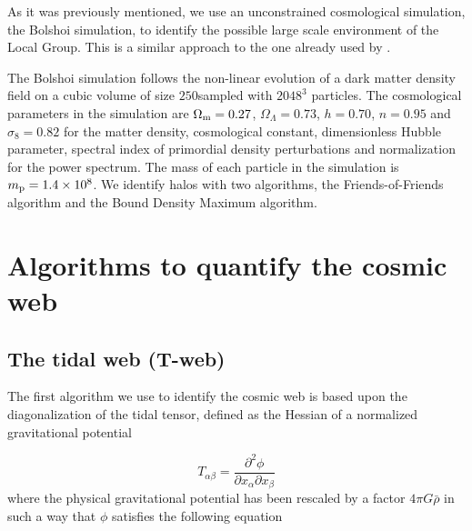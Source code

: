\documentclass[a4,useAMS,usenatbib,usegraphicx]{latex/mn2e}
\begin{document}
As it was previously mentioned, we use an unconstrained cosmological 
simulation, the Bolshoi simulation, to identify the possible large scale 
environment of the Local Group. This is a similar approach to the one already 
used by .



The Bolshoi simulation follows the non-linear evolution of a dark matter 
density field on a cubic volume of size $250$\hMpc sampled with $2048^3$ 
particles. The cosmological parameters in the simulation are 
$\Omega_{\rm m}=0.27$, $\Omega_{\Lambda}=0.73$, $h=0.70$, $n=0.95$ and 
$\sigma_{8}=0.82$ for the matter density, cosmological constant, 
dimensionless Hubble parameter, spectral index of primordial density 
perturbations and normalization for the power spectrum. The mass of each 
particle in the simulation is $m_{\rm p}=1.4\times 10^{8}$\hMsun.
We identify halos with two algorithms, the Friends-of-Friends  algorithm and the Bound Density Maximum algorithm.




\section{Algorithms to quantify the cosmic web}
\label{sec:algorithms_cosmic_web}



\subsection{The tidal web (T-web)}
\label{subsec:Tweb}



The first algorithm  we use to identify the cosmic web is based upon the
diagonalization of the tidal tensor, defined as the Hessian of a 
normalized gravitational potential  


\begin{equation}
T_{\alpha\beta} = \frac{\partial^2\phi}{\partial x_{\alpha}\partial x_{\beta}}
\end{equation}
where the physical gravitational potential has been rescaled by a factor 
$4\pi G\bar{\rho}$ in such a way that $\phi$ satisfies the following 
equation
\end{document}

